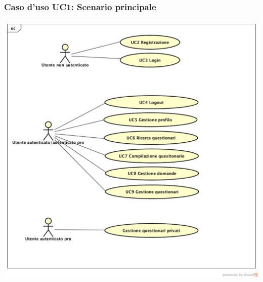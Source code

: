 \subsubsection{Caso d'uso UC1: Scenario principale}
\begin{center}
\includegraphics[scale=0.5]{UML/UC1.png}
\end{center}
